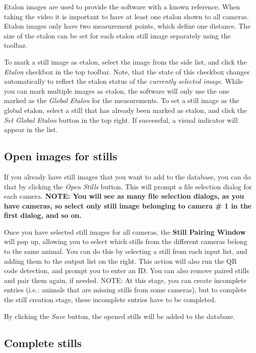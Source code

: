 \documentclass[10pt,a4paper,oneside]{report}             %
\begin{document}
Etalon images are used to provide the software with a known reference. When taking the video it is important to have at least one etalon shown to all cameras. Etalon images only have two measurement points, which define one distance. The size of the etalon can be set for each etalon still image separately using the toolbar.

To mark a still image as etalon, select the image from the side list, and click the \textit{Etalon} checkbox in the top toolbar. Note, that the state of this checkbox changes automatically to reflect the etalon status of the \textit{currently selected image}. While you can mark multiple images as etalon, the software will only use the one marked as the \textit{Global Etalon} for the measurements. To set a still image as the global etalon, select a still that has already been marked as etalon, and click the \textit{Set Global Etalon} button in the top right. If successful, a visual indicator will appear in the list.

\subsection{Open images for stills} \label{sec:openStill}

If you already have still images that you want to add to the database, you can do that by clicking the \textit{Open Stills} button. This will prompt a file selection dialog for each camera. \textbf{NOTE: You will see as many file selection dialogs, as you have cameras, so select only still image belonging to camera \# 1 in the first dialog, and so on.}

Once you have selected still images for all cameras, the \textbf{Still Pairing Window} will pop up, allowing you to select which stills from the different cameras belong to the same animal. You can do this by selecting a still from each input list, and adding them to the output list on the right. This action will also run the QR code detection, and prompt you to enter an ID. You can also remove paired stills and pair them again, if needed. NOTE: At this stage, you can create incomplete entries (i.e.: animals that are missing stills from some cameras), but to complete the still creation stage, these incomplete entries have to be completed. 

By clicking the \textit{Save} button, the opened stills will be added to the database.

\subsection{Complete stills} \label{sec:compStill}
\end{document}
